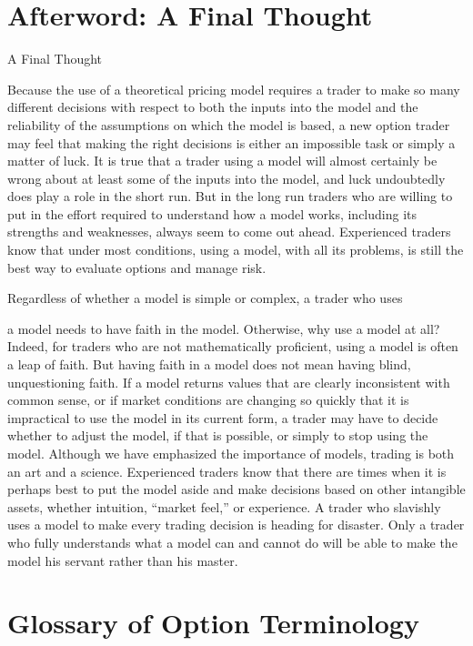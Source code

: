 ﻿\backmatter

\chapter{Afterword: A Final Thought}

\noindent A Final Thought\par
Because the use of a theoretical pricing model requires a trader to make so many different decisions with respect to both the inputs into the model and the reliability of the assumptions on which the model is based, a new option trader may feel that making the right decisions is either an impossible task or simply a matter of luck. It is true that a trader using a model will almost certainly be wrong about at least some of the inputs into the model, and luck undoubtedly does play a role in the short run. But in the long run traders who are willing to put in the effort required to understand how a model works, including its strengths and weaknesses, always seem to come out ahead. Experienced traders know that under most conditions, using a model, with all its problems, is still the best way to evaluate options and manage risk.\par
Regardless of whether a model is simple or complex, a trader who uses\par
a model needs to have faith in the model. Otherwise, why use a model at all? Indeed, for traders who are not mathematically proficient, using a model is often a leap of faith. But having faith in a model does not mean having blind, unquestioning faith. If a model returns values that are clearly inconsistent with common sense, or if market conditions are changing so quickly that it is impractical to use the model in its current form, a trader may have to decide whether to adjust the model, if that is possible, or simply to stop using the model. Although we have emphasized the importance of models, trading is both an art and a science. Experienced traders know that there are times when it is perhaps best to put the model aside and make decisions based on other intangible assets, whether intuition, ``market feel,'' or experience. A trader who slavishly uses a model to make every trading decision is heading for disaster. Only a trader who fully understands what a model can and cannot do will be able to make the model his servant rather than his master.\par

\chapter{Glossary of Option Terminology}

